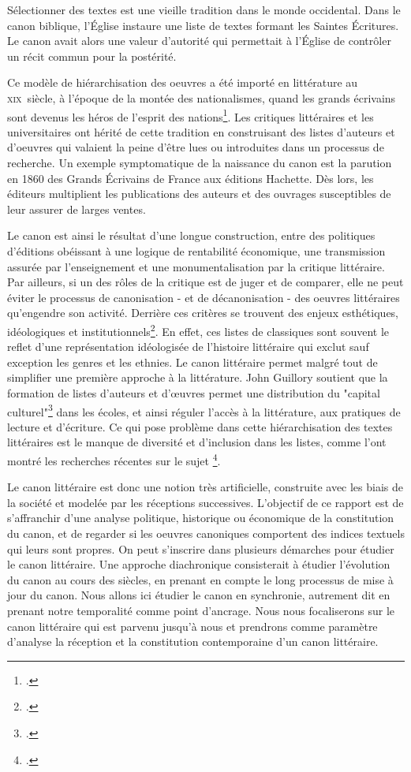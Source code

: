 \documentclass[a4paper,twoside,12pt]{book}
\begin{document}
Sélectionner des textes est une vieille tradition dans le monde occidental. Dans le canon biblique, l'Église instaure une liste de textes formant les Saintes Écritures. Le canon avait alors une valeur d'autorité qui permettait à l'Église de contrôler un récit commun pour la postérité.

Ce modèle de hiérarchisation des oeuvres a été importé en littérature au  \textsc{xix}\ieme ~siècle, à l'époque de la montée des nationalismes, \og quand les grands écrivains sont devenus les héros de l'esprit des nations\fg\footcites{compagnon_demon_2007}. Les critiques littéraires et les universitaires ont hérité de cette tradition en construisant des listes d'auteurs et d'oeuvres qui valaient la peine d'être lues ou introduites dans un processus de recherche. Un exemple symptomatique de la naissance du canon est la parution en 1860 des \og Grands Écrivains de France\fg{} aux éditions Hachette. Dès lors, les éditeurs multiplient les publications des auteurs et des ouvrages susceptibles de leur assurer de larges ventes. 

Le canon est ainsi le résultat d'une longue construction, entre des politiques d'éditions obéissant à une logique de rentabilité économique, une transmission assurée par l'enseignement et une monumentalisation par la critique littéraire. Par ailleurs, si un des rôles de la critique est de juger et de comparer, elle ne peut éviter le processus de canonisation - et de décanonisation - des oeuvres littéraires qu'engendre son activité. Derrière ces critères se trouvent des enjeux esthétiques, idéologiques et institutionnels\footcites{lucken_canon_2019}. En effet, ces listes de classiques sont souvent le reflet d'une représentation idéologisée de l'histoire littéraire qui exclut sauf exception les genres et les ethnies. Le canon littéraire permet malgré tout de simplifier une première approche à la littérature. John Guillory soutient que la formation de listes d'auteurs et d'œuvres permet une distribution du "capital culturel"\footcites{guillory_cultural_1993} dans les écoles, et ainsi réguler l'accès à la littérature, aux pratiques de lecture et d'écriture. Ce qui pose problème dans cette hiérarchisation des textes littéraires est le manque de diversité et d'inclusion dans les listes, comme l'ont montré les recherches récentes sur le sujet \footcites{gonzalez_measuring_2021}.

Le canon littéraire est donc une notion très artificielle, construite avec les biais de la société et modelée par les réceptions successives. L'objectif de ce rapport est de s'affranchir d'une analyse politique, historique ou économique de la constitution du canon, et de regarder si les oeuvres canoniques comportent des indices textuels qui leurs sont propres. On peut s'inscrire dans plusieurs démarches pour étudier le canon littéraire. Une approche diachronique consisterait à étudier l'évolution du canon au cours des siècles, en prenant en compte le long processus de mise à jour du canon. Nous allons ici étudier le canon en synchronie, autrement dit en prenant notre temporalité comme point d'ancrage. Nous nous focaliserons sur le canon littéraire qui est parvenu jusqu'à nous et prendrons comme paramètre d'analyse la réception et la constitution contemporaine d'un canon littéraire.
\end{document}
